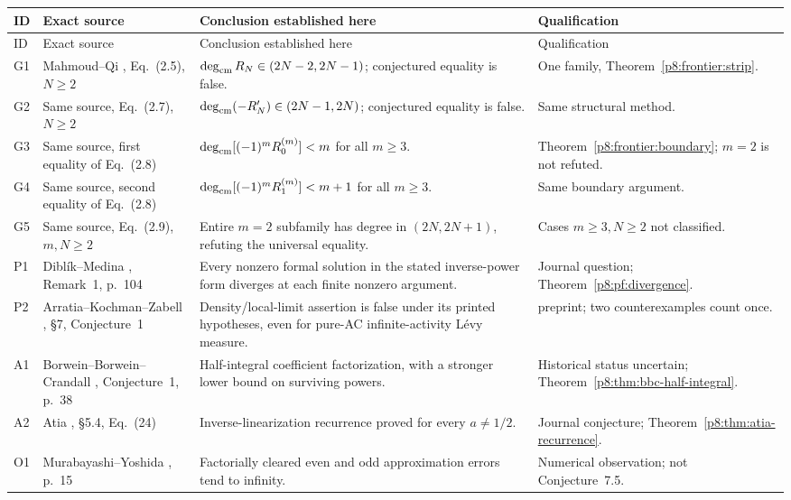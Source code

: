 \documentclass[11pt,a4paper]{article}
\theoremstyle{definition}
\theoremstyle{remark}
\numberwithin{equation}{section}
\begin{document}
\newpage
\small
\begin{longtable}{@{}>{\raggedright\arraybackslash}p{}>{\raggedright\arraybackslash}p{}>{\raggedright\arraybackslash}p{}>{\raggedright\arraybackslash}p{}@{}}
\toprule
ID & Exact source & Conclusion established here & Qualification\\
\midrule
\endfirsthead
\toprule ID & Exact source & Conclusion established here & Qualification\\
\midrule
\endhead
G1 & Mahmoud--Qi \cite{p8:MahmoudQi2022}, Eq.~(2.5), $N\ge2$
 & $\deg_{\rm cm}R_N\in(2N-2,2N-1)$; conjectured equality is false.
 & One family, Theorem~\ref{p8:frontier:strip}.\\[5pt]
G2 & Same source, Eq.~(2.7), $N\ge2$
 & $\deg_{\rm cm}(-R_N')\in(2N-1,2N)$; conjectured equality is false.
 & Same structural method.\\[5pt]
G3 & Same source, first equality of Eq.~(2.8)
 & $\deg_{\rm cm}[(-1)^mR_0^{(m)}]<m$ for all $m\ge3$.
 & Theorem~\ref{p8:frontier:boundary}; $m=2$ is not refuted.\\[5pt]
G4 & Same source, second equality of Eq.~(2.8)
 & $\deg_{\rm cm}[(-1)^mR_1^{(m)}]<m+1$ for all $m\ge3$.
 & Same boundary argument.\\[5pt]
G5 & Same source, Eq.~(2.9), $m,N\ge2$
 & Entire $m=2$ subfamily has degree in $(2N,2N+1)$, refuting the universal equality.
 & Cases $m\ge3,N\ge2$ not classified.\\[5pt]
P1 & Dibl\'ik--Medina \cite{p8:DiblikMedina2018}, Remark~1, p.~104
 & Every nonzero formal solution in the stated inverse-power form diverges at each finite nonzero argument.
 & Journal question; Theorem~\ref{p8:pf:divergence}.\\[5pt]
P2 & Arratia--Kochman--Zabell \cite{p8:ArratiaKochmanZabell2016}, \S7, Conjecture~1
 & Density/local-limit assertion is false under its printed hypotheses, even for pure-AC infinite-activity L\'evy measure.
 & 2016 preprint; two counterexamples count once.\\[5pt]
A1 & Borwein--Borwein--Crandall \cite{p8:BBC2007}, Conjecture~1, p.~38
 & Half-integral coefficient factorization, with a stronger lower bound on surviving powers.
 & Historical status uncertain; Theorem~\ref{p8:thm:bbc-half-integral}.\\[5pt]
A2 & Atia \cite{p8:Atia2024}, \S5.4, Eq.~(24)
 & Inverse-linearization recurrence proved for every $a\ne1/2$.
 & Journal conjecture; Theorem~\ref{p8:thm:atia-recurrence}.\\[5pt]
O1 & Murabayashi--Yoshida \cite{p8:MurabayashiYoshida}, p.~15
 & Factorially cleared even and odd approximation errors tend to infinity.
 & Numerical observation; not Conjecture~7.5.\\
\bottomrule
\end{longtable}
\normalsize
\end{document}
